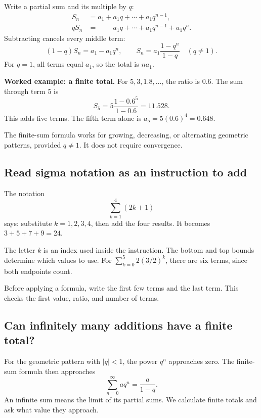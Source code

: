 Write a partial sum and its multiple by \(q\): \[
\begin{aligned}
S_n&=a_1+a_1q+\cdots+a_1q^{n-1},\\
qS_n&=\phantom{a_1+{}}a_1q+\cdots+a_1q^{n-1}+a_1q^n.
\end{aligned}
\] Subtracting cancels every middle term: \[
(1-q)S_n=a_1-a_1q^n,\qquad
S_n=a_1\frac{1-q^n}{1-q}\quad(q\ne1).
\] For \(q=1\), all terms equal \(a_1\), so the total is \(na_1\).

\textbf{Worked example: a finite total.} For \(5,3,1.8,\ldots\), the ratio is \(0.6\). The sum through term 5 is \[
S_5=5\frac{1-0.6^5}{1-0.6}=11.528.
\] This adds five terms. The fifth term alone is \(a_5=5(0.6)^4=0.648\).

The finite-sum formula works for growing, decreasing, or alternating geometric patterns, provided \(q\ne1\). It does not require convergence.

\hypertarget{m9-read-sigma-notation-as-an-instruction-to-add}{%
\subsection{Read sigma notation as an instruction to add}\label{m9-read-sigma-notation-as-an-instruction-to-add}}

The notation \[
\sum_{k=1}^{4}(2k+1)
\] says: substitute \(k=1,2,3,4\), then add the four results. It becomes \(3+5+7+9=24\).

The letter \(k\) is an index used inside the instruction. The bottom and top bounds determine which values to use. For \(\sum_{k=0}^{5}2(3/2)^k\), there are six terms, since both endpoints count.

Before applying a formula, write the first few terms and the last term. This checks the first value, ratio, and number of terms.

\hypertarget{m9-can-infinitely-many-additions-have-a-finite-total}{%
\subsection{Can infinitely many additions have a finite total?}\label{m9-can-infinitely-many-additions-have-a-finite-total}}

For the geometric pattern with \(|q|<1\), the power \(q^n\) approaches zero. The finite-sum formula then approaches \[
\sum_{n=0}^{\infty}aq^n=\frac{a}{1-q}.
\] An infinite sum means the limit of its partial sums. We calculate finite totals and ask what value they approach.

